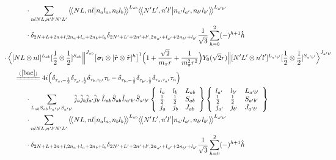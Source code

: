 \documentclass[master]{shnuthesis}
\newcommand{\llangle}{\big\langle\!\big\langle}
\newcommand{\rrangle}{\big\rangle\!\big\rangle}
\newcommand{\bmr}{\textbf{\textit{r}}}
\newcommand{\ap}{a^\prime}
\newcommand{\bp}{b^\prime}
\newcommand{\il}{\!\!\!\!\!\!\!\!\!\!}
\newcommand{\ii}{\!\!\!\!\!\!\!\!\!\!\!\!\!\!\!\!\!\!\!\!}
\newcommand{\zdydh}{\xlongequal}
\begin{document}
$$\begin{align}
    & \cdot \sum_{nlNL,n^\prime l^\prime N^\prime L^\prime} \llangle N L, n l \big| n_{a} l_{a}, n_{b} l_{b} \rrangle^{L_{ab}} \llangle N^\prime L^\prime, n^\prime l^\prime \big| n_{a^\prime} l_{a^\prime}, n_{b^\prime} l_{b^\prime} \rrangle^{L_{\ap\bp}} \notag\\
    & \cdot \delta_{2N+L+2n+l,2n_a+l_a+2n_b+l_b}\delta_{2N^\prime+L^\prime+2n^\prime+l^\prime,2n_{a^\prime}+l_{a^\prime}+2n_{b^\prime}+l_{b^\prime}} \frac{1}{\sqrt{3}} \sum_{h=0}^{2} (-)^{h+1}\hat{h}  \notag\\
    &\ii \cdot \Big\langle [N L \otimes n l]^{L_{ab}} [\frac{1}{2}\otimes\frac{1}{2}]^{S_{ab}} \Big\|^{J_{ab}} \big[ \bm{\sigma}_l \otimes [\hat{\bmr} \otimes \hat{\bmr}]^h \big]^1 \Big(1+\frac{\sqrt{2}}{m_\pi r}+\frac{1}{m_\pi^2 r^2}\Big) Y_0(\sqrt{2}r) \Big\| [N^\prime L^\prime \otimes n^\prime l^\prime]^{L_{\ap\bp}} [\frac{1}{2}\otimes\frac{1}{2}]^{S_{\ap\bp}} \Big\rangle^{J_{\ap \bp}} \\
    &\il \zdydh{(\ref{bac})} 4i \Big( \delta_{\tau_a,-\frac{1}{2}}\delta_{\tau_{\ap},\frac{1}{2}}\delta_{\tau_b,\tau_{\bp}}\tau_b - \delta_{\tau_b,-\frac{1}{2}}\delta_{\tau_{\bp},\frac{1}{2}}\delta_{\tau_a,\tau_{\ap}}\tau_a \Big) \notag\\
    & \cdot \sum_{L_{ab}S_{ab}L_{\ap\bp}S_{\ap\bp}} \hat{j}_a\hat{j}_b\hat{j}_{\ap}\hat{j}_{\bp}\hat{L}_{ab}\hat{S}_{ab}\hat{L}_{\ap\bp}\hat{S}_{\ap\bp}  \left\{\begin{array}{lll}l_{a} & l_{b} & L_{ab} \\ \frac{1}{2} & \frac{1}{2} & S_{ab} \\j_{a} & j_{b} & J_{ab} \end{array}\right\} \left\{\begin{array}{lll}l_{\ap} & l_{\bp} & L_{\ap\bp} \\ \frac{1}{2} & \frac{1}{2} & S_{\ap\bp} \\j_{\ap} & j_{\bp} & J_{\ap\bp} \end{array}\right\}  \notag \\
    & \cdot \sum_{nlNL,n^\prime l^\prime N^\prime L^\prime} \llangle N L, n l \big| n_{a} l_{a}, n_{b} l_{b} \rrangle^{L_{ab}} \llangle N^\prime L^\prime, n^\prime l^\prime \big| n_{a^\prime} l_{a^\prime}, n_{b^\prime} l_{b^\prime} \rrangle^{L_{\ap\bp}} \notag\\
    & \cdot \delta_{2N+L+2n+l,2n_a+l_a+2n_b+l_b}\delta_{2N^\prime+L^\prime+2n^\prime+l^\prime,2n_{a^\prime}+l_{a^\prime}+2n_{b^\prime}+l_{b^\prime}} \frac{1}{\sqrt{3}} \sum_{h=0}^{2} (-)^{h+1}\hat{h}  \notag\\

\end{align}$$
\end{document}

